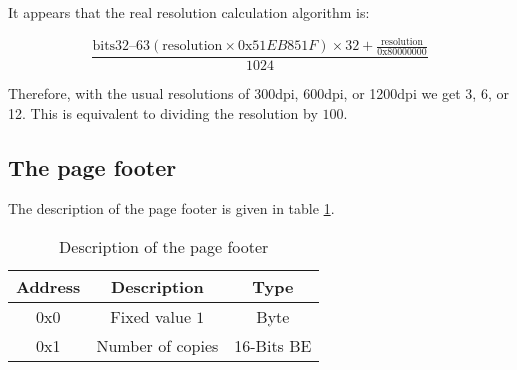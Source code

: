 It appears that the real resolution calculation algorithm is:

\begin{equation*}
\frac{\textrm{bits32--63}(\textrm{resolution} \times \textrm{0x}51EB851F)
\times 32 + \frac{\textrm{resolution}}{\textrm{0x}80000000}}{1024}
\end{equation*}

Therefore, with the usual resolutions of 300dpi, 600dpi, or 1200dpi
we get 3, 6, or 12.  This is equivalent to dividing the resolution by $100$.


\subsection{The page footer}
The description of the page footer is given in table \ref{tab:fin_page}.

\begin{table}[!ht]
\centering
\begin{tabular}{| c | c | c |}
\hline
\textbf{Address} & \textbf{Description} & \textbf{Type} \\
\hline
\hline
0x0 & Fixed value $1$ & Byte\\
0x1 & Number of copies & 16-Bits BE \\
\hline
\end{tabular}
\caption{Description of the page footer}
\label{tab:fin_page}
\end{table}
